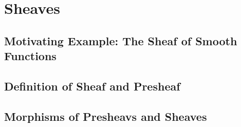 \documentclass[openany]{book}
\begin{document}
\chapter{Sheaves}

\section{Motivating Example: The Sheaf of Smooth Functions}



\section{Definition of Sheaf and Presheaf}



\section{Morphisms of Presheavs and Sheaves}


\end{document}
